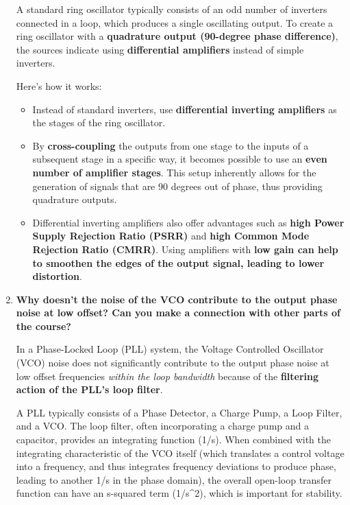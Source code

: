 \documentclass[
  a4paper,
]{article}
\providecommand{\tightlist}{%
  \setlength{\itemsep}{0pt}\setlength{\parskip}{0pt}}
\begin{document}
\begin{enumerate}
  A standard ring oscillator typically consists of an odd number of
  inverters connected in a loop, which produces a single oscillating
  output. To create a ring oscillator with a \textbf{quadrature output
  (90-degree phase difference)}, the sources indicate using
  \textbf{differential amplifiers} instead of simple inverters.

  Here's how it works:

  \begin{itemize}
  \tightlist
  \item
    Instead of standard inverters, use \textbf{differential inverting
    amplifiers} as the stages of the ring oscillator.
  \item
    By \textbf{cross-coupling} the outputs from one stage to the inputs
    of a subsequent stage in a specific way, it becomes possible to use
    an \textbf{even number of amplifier stages}. This setup inherently
    allows for the generation of signals that are 90 degrees out of
    phase, thus providing quadrature outputs.
  \item
    Differential inverting amplifiers also offer advantages such as
    \textbf{high Power Supply Rejection Ratio (PSRR)} and \textbf{high
    Common Mode Rejection Ratio (CMRR)}. Using amplifiers with
    \textbf{low gain can help to smoothen the edges of the output
    signal, leading to lower distortion}.
  \end{itemize}
\item
  \textbf{Why doesn't the noise of the VCO contribute to the output
  phase noise at low offset? Can you make a connection with other parts
  of the course?}

  In a Phase-Locked Loop (PLL) system, the Voltage Controlled Oscillator
  (VCO) noise does not significantly contribute to the output phase
  noise at low offset frequencies \emph{within the loop bandwidth}
  because of the \textbf{filtering action of the PLL's loop filter}.

  A PLL typically consists of a Phase Detector, a Charge Pump, a Loop
  Filter, and a VCO. The loop filter, often incorporating a charge pump
  and a capacitor, provides an integrating function (1/s). When combined
  with the integrating characteristic of the VCO itself (which
  translates a control voltage into a frequency, and thus integrates
  frequency deviations to produce phase, leading to another 1/s in the
  phase domain), the overall open-loop transfer function can have an
  s-squared term (1/s\^{}2), which is important for stability.


\end{enumerate}
\end{document}
